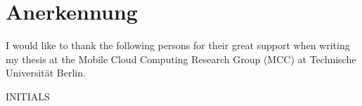 
\cleardoublepage
{}
\section*{Anerkennung}

I would like to thank the following persons for their great support when writing my thesis at the Mobile Cloud Computing Research Group (MCC) at Technische Universität Berlin.

\begin{flushright}
INITIALS\\[1pc]
\end{flushright}
